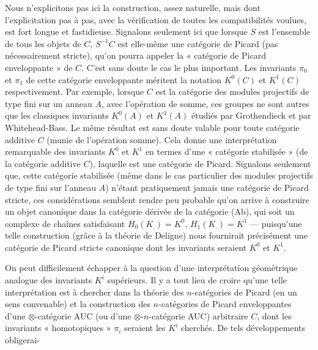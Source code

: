 \documentclass[11pt,a4paper]{article}
\begin{document}
Nous n'explicitons pas ici la construction, assez naturelle, mais dont
l'explicitation pas à pas, avec la vérification de toutes les
compatibilités voulues, est fort longue et fastidieuse.  Signalons seulement ici que lorsque $S$
est l'ensemble de tous les objets de $C$, $S^{-1}C$ est elle-même une
catégorie de Picard (pas nécessairement stricte), qu'on pourra appeler la
« catégorie de Picard enveloppante » de $C$. C'est sans doute le cas le
plus important. Les invariants $\pi_{0}$ et $\pi_{1}$ de cette catégorie
enveloppante méritent la notation $K^{0}(C)$ et $K^{1}(C)$ respectivement.
Par exemple, lorsque $C$ est la catégorie des modules projectifs de type
fini sur un anneau $A$, avec l'opération de somme,  ces groupes ne sont autres que les classiques invariants
$K^{0}(A)$ et $K^{1}(A)$ étudiés par Grothendieck et par Whitehead-Bass.
 Le même résultat est sans
doute valable pour toute catégorie additive $C$ (munie de \struck{\ill}
l'opération somme). Cela donne une interprétation remarquable des
invariants $K^{0}$ et $K^{1}$ en termes d'une « catégorie stabilisée » (de
la catégorie additive $C$), laquelle est une catégorie de Picard.
Signalons seulement que, cette catégorie stabilisée (même dans le cas
particulier des modules projectifs de type fini sur l'anneau $A$) n'étant
pratiquement jamais une catégorie de Picard stricte, ces considérations
semblent rendre peu probable qu'on arrive à construire un objet canonique
dans la catégorie dérivée de la catégorie (Ab), qui soit un complexe de
chaînes satisfaisant $H_{0}(K_{.}) = K^{0}$, $H_{1}(K_{.}) = K^{1}$ —
puisqu'une telle construction (grâce à la théorie de Deligne) nous
fournirait précisément une catégorie de Picard stricte canonique dont les
invariants seraient $K^{0}$ et $K^{1}$.

On peut difficilement échapper à la question d'une interprétation
géométrique analogue des invariants $K^{i}$ supérieurs. Il y a tout lieu
de croire qu'une telle interprétation est à chercher dans la théorie des
$n$-catégories de Picard (en un sens convenable) et la construction des
$n$-catégories de Picard enveloppantes d'une $\otimes$-catégorie AUC (ou
d'une $\otimes$-$n$-catégorie AUC) arbitraire $C$, dont les invariants
« homotopiques » $\pi_{i}$ seraient les $K^{i}$ cherchés. De tels
développements obligerai-

\end{document}
